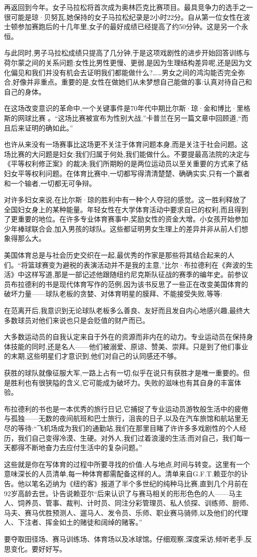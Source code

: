 再返回到今年。女子马拉松将首次成为奥林匹克比赛项目。最具竞争力的选手之一很可能是琼·贝努瓦,她保持的女子马拉松纪录是2小时22分。自从第一位女性在波士顿参加赛跑后的十几年里,女子的最好成绩已经提高了约50分钟。这是另一个永恒。

与此同时,男子马拉松成绩只提高了几分钟,于是这项戏剧性的进步开始回答训练与荷尔蒙之间的关系问题:女性比男性更慢、更弱,是因为生理结构差异呢,还是因为文化偏见和我们并没有机会去证明我们都能做什么?……男女之间的鸿沟能否完全弥合,好像并非重点。重要的是,女性在做她们从未梦想自己能做的事:认真对待自己和自己的身体。

在这场改变意识的革命中,一个关键事件是70年代中期比尔斯·琼·金和博比·里格斯的网球比赛 。“这场比赛被宣布为性别大战,”卡普兰在另一篇文章中回顾道,“而且后来证明的确如此。”

也许从来没有一场赛事比这场更不关注于体育问题本身,而是关注于社会问题。这场比赛的大问题是妇女:我们归属于何处,我们能做什么。不要提最高法院的决定与《平等权利修正案》的裁决;我们所期盼的是两位运动员以至关重要的方式来了结妇女平等权利问题。在体育比赛中,一切都写得清清楚楚、确确实实,只有一个赢者和一个输者,一切都无可争辩。

对许多妇女来说,在比尔斯·琼的胜利中有一种个人夺冠的感觉。这一胜利释放了全国妇女身上的某种能量。年轻女性在大学体育活动中要求自已的权利,而且得到了更重要的地位。在许多专业体育赛事中,奖励女性的资金大增。小女孩开始参加少年棒球联合会,加入男孩的球队。这些都证明男女生理上的差异并非从前人们想象得那么大。

美国体育总是与社会历史交织在一起,最优秀的作家是那些将其结合起来的人们。“将篮球赛变为避税的表演活动并不是我的主意,”比尔·布拉德利在《奔波的生活》中这样写道,那是一部记述他跟随纽约尼克斯队征战的赛季的编年史。前参议员布拉德利的书是现代体育写作的范例,因为该书反思了一些正在改变美国体育的破坏力量——球队老板的贪婪、对体育明星的膜拜、不能接受失败,等等:

在范离开后,我意识到无论球队老板多么善良、友好而且发自内心地感兴趣,最终大多数球员对他们来说也只是会贬值的财产而已。

大多数运动员的自我认定来自于外在的资源而非内在的动力。专业运动员在保持身体技能的同时,还是名人——他们被溺爱、原谅、赞美、崇拜。只是到了他们事业的末期,这些明星们才意识到,他们对自己的认同感还不够。

获胜的球队就像征服大军,一路上占有一切,似乎在说只有获胜才是唯一重要的。但是胜利也有很狭隘的含义,它可能成为破坏力。失败的滋味也有其自身的丰富体验。

布拉德利的书也是一本优秀的旅行日记,它捕捉了专业运动员游牧般生活中的疲倦与孤独——无数的夜间航班和巴士旅行，沮丧的日子,以及在汽车旅馆和航站里无尽的等待:“飞机场成为我们的通勤站,我们在那里目睹了许许多多戏剧性的个人经历，我们自己变得冷漠、生硬。对外人,我们过着浪漫的生活;而对自己，我们每一天都得不断地奋力去应付生活中的复杂问题。”

这些就是你在写体育的过程中所要寻找的价值:人与地点,时间与转变。这里有一个意味深长的人员清单,每一种体育都需配备这样的人。清单来自G.F.T.赖亚尔的讣告。他以笔名迈纳为《纽约客》报道了半个多世纪的纯种马比赛,直到几个月前在92岁高龄去世。讣告说赖亚尔“后来认识了与赛马相关的形形色色的人——马主人、饲养员、管事、裁判、计时员、同注分彩管理员、私人侦探、训练师、厨师、马夫、赛马优胜预测人、遛马人、发令员、乐师、职业赛马骑师,以及他们的代理人、下注者、挥金如土的赌徒和阔绰的赌客。”

要夺取田径场、赛马训练场、体育场以及冰球馆。仔细观察,深度采访,倾听老手,反思变化。要好好写。